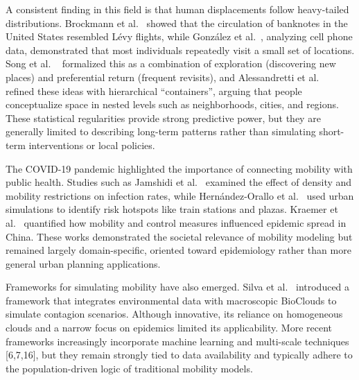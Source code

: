 A consistent finding in this field is that human displacements follow heavy-tailed distributions. Brockmann et al.~\cite{brockmann2006scaling} showed that the circulation of banknotes in the United States resembled Lévy flights, while González et al.~\cite{gonzalez2008understanding}, analyzing cell phone data, demonstrated that most individuals repeatedly visit a small set of locations. Song et al. ~\cite{natureSong2010exploration}  formalized this as a combination of exploration (discovering new places) and preferential return (frequent revisits), and Alessandretti et al.~\cite{alessandretti2020nature} refined these ideas with hierarchical ``containers'', arguing that people conceptualize space in nested levels such as neighborhoods, cities, and regions. These statistical regularities provide strong predictive power, but they are generally limited to describing long-term patterns rather than simulating short-term interventions or local policies.

The COVID-19 pandemic highlighted the importance of connecting mobility with public health. Studies such as Jamshidi et al.~\cite{jamshidi2020global} examined the effect of density and mobility restrictions on infection rates, while Hernández-Orallo et al.~\cite{hernandez2021human} used urban simulations to identify risk hotspots like train stations and plazas. Kraemer et al.~\cite{natureKramer2020mobilityCovid} quantified how mobility and control measures influenced epidemic spread in China. These works demonstrated the societal relevance of mobility modeling but remained largely domain-specific, oriented toward epidemiology rather than more general urban planning applications.

Frameworks for simulating mobility have also emerged. Silva et al.~\cite{silva2020lodus} introduced a framework that integrates environmental data with macroscopic BioClouds to simulate contagion scenarios. Although innovative, its reliance on homogeneous clouds and a narrow focus on epidemics limited its applicability. More recent frameworks increasingly incorporate machine learning and multi-scale techniques [6,7,16], but they remain strongly tied to data availability and typically adhere to the population-driven logic of traditional mobility models.

